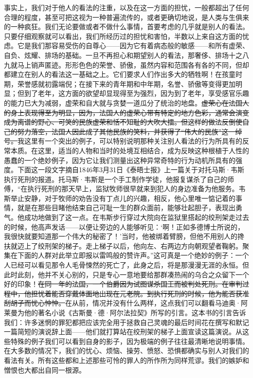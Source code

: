\documentclass[12pt,oneside]{book}
\begin{document}
事实上，我们对于他人的看法的注重，以及在这一方面的担忧，一般都超出了任何合理的程度，甚至可把这视为一种普遍流传的，或者更确切地说，是人类与生俱来的一种疯狂。我们无论要做或者不做什么事情，首要考虑的几乎就是别人的看法。只要仔细观察就可以看出，我们所经历过的担忧和害怕，半数以上来自这方面的忧虑。它是我们那容易受伤的自尊心——因为它有着病态般的敏感——和所有虚荣、自负、炫耀、排场的基础。一旦不再担心和期望别人的看法，那奢侈、排场十之八九就马上销声匿迹。形形色色的荣誉、骄傲，虽然内容和范围各有各的不同，但却都建立在别人的看法这一基础之上。它们要求人们作出多大的牺牲啊！在孩童时期，荣誉感就初露端倪；在接下来的青年期和中年期，名誉、骄傲等变得更加明显；但到了老年，这方面的欲望却显现得至为强烈，因为到了老年，享受感官乐趣的能力已大为减弱，虚荣和自大就与贪婪一道瓜分了统治的地盘。\sout{虚荣心在法国人的身上表现得至为明显，因为，法国人的虚荣心带有特定的地方色彩，通常会演变成为离谱的野心、可笑的民族虚荣和恬不知耻的大吹大擂。但这样的做法反倒使自己的努力落空，法国人因此成了其他民族的笑料，并获得了“伟大的民族”这一绰号。}我这里有一个突出的例子，可以特别说明那种关注别人看法的行为所具有的反常本质。在这里，适当的人物和当时的处境互相结合，成为反映这种根植于人性的愚蠢的一个绝妙例子，因为它让我们测量出这种异常奇特的行为动机所具有的强度。下面这一段文字摘自1846年3月31日《泰晤士报》上一篇关于对托马斯·韦斯执行死刑的报道。托马斯·韦斯是一个手工制作学徒，他报复谋杀了自己的师傅，“在执行死刑的那天早上，监狱牧师很早就来到犯人的身边准备为他服务。韦斯举止安静，对于牧师的劝告没有丁点儿的兴趣，相反，他心里唯一惦记着的事情，就是在那些目睹他结束自己可耻一生的群众面前，能够壮起胆子，表现出勇气。他成功地做到了这一点。在韦斯步行穿过大院向在监狱里搭起的绞刑架走过去的时候，他高声发话——以便让旁边的人能够听见：‘啊！正如多德博士所说的，我很快就要知道那一个伟大的秘密了！’当时，他被绑着臂膀，但他不用别人的搀扶就迈上了绞刑架的梯子。走上梯子以后，他向左、右两边方向朝观望者鞠躬。聚集在下面的人群对此举立即报以雷鸣般的赞许声。”这可真是一个绝妙的例子：一个人已经可以看见那令人毛骨悚然的死亡了，此身之后，将是那漫漫无涯的永恒。但此时此刻，他并不关心别的，只是专心一意地要给那群凑热闹的乌合之众留下一个好的印象！\sout{在同一年的法国，一个伯爵因为试图谋杀国王而被判处死刑。在审判过程中，他担忧着能否穿戴体面地出现在元老院。到执行死刑的时候，他为能否获准刮胡子而忧心忡忡。}在从前，情况并没有什么两样，这点我们可以翻看马迪奥·阿莱曼为他的著名小说《古斯曼·德·阿尔法拉契》所写的引言。这本书的引言告诉我们：许多迷惘的罪犯都把应该完全用于拯救自己灵魂的最后时间花在撰写和默记一篇简短的演说辞上面——他们就打算站在绞刑架的梯子上面宣读这篇演说。从这些特殊的例子我们可以看到自身的影子，因为极端的例子往往最清晰地说明事情。在大多数的情况下，我们的忧心、烦恼、操劳、愤怒、恐惧都确实与别人对我们的看法有关。所有这些都和上述那些可怜的罪人的所作所为同样荒谬。我们的嫉妒和憎恨也大都出自同一根源。 
\end{document}
